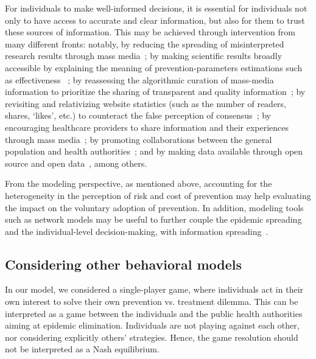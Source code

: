 For individuals to make well-informed decisions, it is essential for individuals not only to have access to accurate and clear information, but also for them to trust these sources of information. This may be achieved through intervention from many different fronts: notably, by reducing the spreading of misinterpreted research results through mass media~\cite[]{Haneef2015}; by making scientific results broadly accessible by explaining the meaning of prevention-parameters estimations such as effectiveness ~\cite[]{Underhill2016}; by reassessing the algorithmic curation of mass-media information to prioritize the sharing of transparent and quality information~\cite[]{Lorenz2020}; by revisiting and relativizing website statistics (such as the number of readers, shares, `likes', etc.) to counteract the false perception of consensus~\cite[]{Lorenz2020}; by encouraging healthcare providers to share information and their experiences through mass media~\cite[]{Hernandez2021}; by promoting collaborations between the general population and health authorities~\cite[]{WHO_InfodemicTraining}; and by making data available through open source and open data~\cite[]{Kobayashi2021}, among others.

From the modeling perspective, as mentioned above, accounting for the heterogeneity in the perception of risk and cost of prevention may help evaluating the impact on the voluntary adoption of prevention. In addition, modeling tools such as network models may be useful to further couple the epidemic spreading and the individual-level decision-making, with information spreading~\cite[]{Chang2020}.


\subsection{Considering other behavioral models}
In our model, we considered a single-player game, where individuals act in their own interest to solve their own prevention vs. treatment dilemma. This can be interpreted as a game between the individuals and the public health authorities aiming at epidemic elimination. Individuals are not playing against each other, nor considering explicitly others' strategies. Hence, the game resolution should not be interpreted as a Nash equilibrium.

